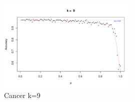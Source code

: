 \documentclass{article}
\begin{document}
\begin{figure}
 \centering
 \includegraphics[width=0.6\textwidth]{./figures/Cancer_k9.pdf}
 \caption{Cancer k=9}
 \label{fig:Cancer9}
\end{figure}
\end{document}
